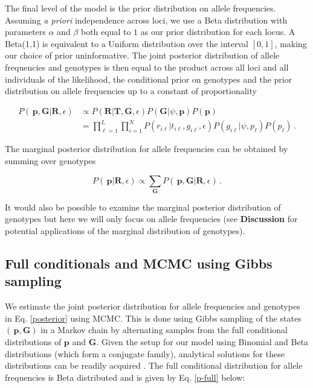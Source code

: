 \documentclass[11pt,english,letterpaper,oneside]{article}
\begin{document}
The final level of the model is the prior distribution on allele frequencies. Assuming \textit{a priori} independence across loci, we use a Beta distribution with parameters $\alpha$ and $\beta$ both equal to $1$ as our prior distribution for each locus. A Beta(1,1) is equivalent to a Uniform distribution over the interval $[0,1]$, making our choice of prior uninformative. The joint posterior distribution of allele frequencies and genotypes is then equal to the product across all loci and all individuals of the likelihood, the conditional prior on genotypes and the prior distribution on allele frequencies up to a constant of proportionality

\begin{align}\label{posterior}
P(\,\bm{p},\bm{G}|\bm{R},\epsilon) &\propto P(\bm{R}|\bm{T},\bm{G}, \epsilon)P(\bm{G}|\psi,\bm{p})P(\bm{p}) \nonumber \\[0.05in]
&= \displaystyle\prod_{\ell=1}^L\displaystyle\prod_{i=1}^N P(r_{i \ell}|t_{i\ell}, g_{i \ell},\epsilon)P(g_{i \ell}|\psi, p_{\ell})P(p_{\ell})\,.
\end{align}

\noindent The marginal posterior distribution for allele frequencies can be obtained by summing over genotypes

\begin{equation}\label{marg_post_p}
P(\,\bm{p}|\bm{R},\epsilon) \propto \displaystyle\sum_{\bm{G}} P(\,\bm{p},\bm{G}|\bm{R},\epsilon)\,.
\end{equation}

\noindent It would also be possible to examine the marginal posterior distribution of genotypes but here we will only focus on allele frequencies (see \textbf{Discussion} for potential applications of the marginal distribution of genotypes).

\medskip
\subsection*{Full conditionals and MCMC using Gibbs sampling}
\medskip

\noindent We estimate the joint posterior distribution for allele frequencies and genotypes in Eq. \ref{posterior} using MCMC. This is done using Gibbs sampling of the states $(\,\bm{p},\bm{G})$ in a Markov chain by alternating samples from the full conditional distributions of $\bm{p}$ and $\bm{G}$. Given the setup for our model using Binomial and Beta distributions (which form a conjugate family), analytical solutions for these distributions can be readily acquired \citep{gelman2014bayesian}. The full conditional distribution for allele frequencies is Beta distributed and is given by Eq. \ref{p-full} below:
\end{document}
